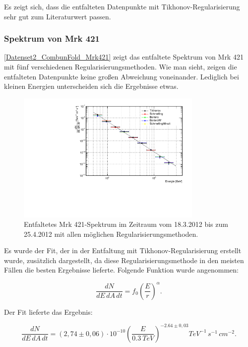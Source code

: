 Es zeigt sich, dass die entfalteten Datenpunkte mit Tikhonov-Regularisierung sehr gut zum Literaturwert passen.

\subsubsection{Spektrum von Mrk 421}
\autoref{Datenset2_CombunFold_Mrk421} zeigt das entfaltete Spektrum von Mrk 421 mit fünf verschiedenen Regularisierungsmethoden.
Wie man sieht, zeigen die entfalteten Datenpunkte keine großen Abweichung voneinander. 
Lediglich bei kleinen Energien unterscheiden sich die Ergebnisse etwas.

\begin{figure}
    \centering
    \includegraphics[width=0.8\textwidth]{./Plots/04_MrkAnalyse/Datenset2/Spektrum_Mrk421.pdf}
    \caption{Entfaltetes Mrk 421-Spektrum im Zeitraum vom 18.3.2012 bis zum 25.4.2012 mit allen möglichen Regularisierungsmethoden.}
    \label{Datenset2_CombunFold_Mrk421}
\end{figure}

Es wurde der Fit, der in der Entfaltung mit Tikhonov-Regularisierung erstellt wurde, zusätzlich dargestellt, da diese Regularisierungsmethode in den meisten Fällen die besten Ergebnisse lieferte.
Folgende Funktion wurde angenommen:

\begin{equation}
 \frac{dN}{dE\,dA\,dt}=f_0\left( \frac{E}{r} \right)^\alpha.
\end{equation}

Der Fit lieferte das Ergebnis:

\begin{equation}
 \frac{dN}{dE\,dA\,dt}=(2,74 \pm 0,06) \cdot 10^{-10}\left( \frac{E}{\SI{0,3}{TeV}} \right)^{-2.64 \pm 0,03} \si{TeV^{-1}\,s^{-1}\,cm^{-2}}.
\end{equation}


